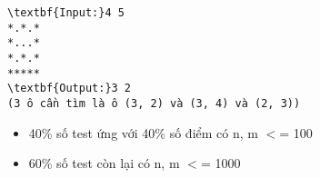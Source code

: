 \begin{verbatim}
\textbf{Input:}4 5
*.*.*
*...*
*.*.*
*****
\textbf{Output:}3 2
(3 ô cần tìm là ô (3, 2) và (3, 4) và (2, 3))
\end{verbatim}
\begin{itemize}
	\item 

40\% số test ứng với 40\% số điểm có n, m $<$= 100
	\item 

60\% số test còn lại có n, m $<$= 1000
\end{itemize}
\begin{verbatim}
 \end{verbatim}